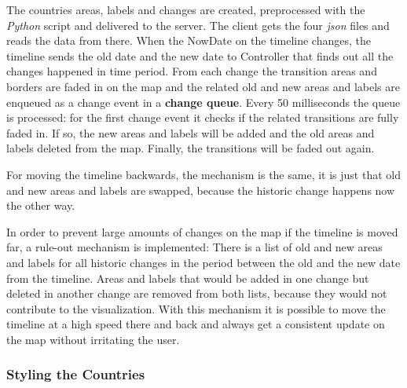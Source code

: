 The countries areas, labels and changes are created, preprocessed with the \textit{Python} script and delivered to the server. The client gets the four \textit{json} files and reads the data from there. When the NowDate on the timeline changes, the timeline sends the old date and the new date to Controller that finds out all the changes happened in time period. From each change the transition areas and borders are faded in on the map and the related old and new areas and labels are enqueued as a change event in a \textbf{change queue}. Every 50 milliseconds the queue is processed: for the first change event it checks if the related transitions are fully faded in. If so, the new areas and labels will be added and the old areas and labels deleted from the map. Finally, the transitions will be faded out again.

For moving the timeline backwards, the mechanism is the same, it is just that old and new areas and labels are swapped, because the historic change happens now the other way.

In order to prevent large amounts of changes on the map if the timeline is moved far, a rule-out mechanism is implemented: There is a list of old and new areas and labels for all historic changes in the period between the old and the new date from the timeline. Areas and labels that would be added in one change but deleted in another change are removed from both lists, because they would not contribute to the visualization. With this mechanism it is possible to move the timeline at a high speed there and back and always get a consistent update on the map without irritating the user.

\subsubsection{Styling the Countries} %
\label{ssub:styling_the_countries}


